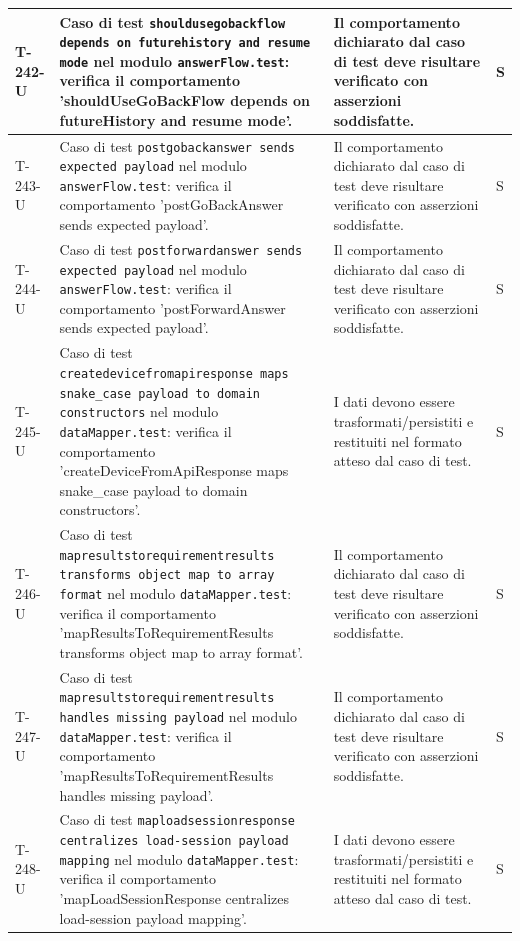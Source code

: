 \documentclass[a4paper,12pt]{article}
\begin{document}
{{\begin{longtable}{|>{\RaggedRight\arraybackslash}p{1.55cm}|>{\RaggedRight\arraybackslash}p{8.0cm}|>{\RaggedRight\arraybackslash}p{4.6cm}|>{\RaggedRight\arraybackslash}p{1.2cm}|}
        \hline
        T-242-U & Caso di test \texttt{shouldusegobackflow depends on futurehistory and resume mode} nel modulo \texttt{answerFlow.test}: verifica il comportamento 'shouldUseGoBackFlow depends on futureHistory and resume mode'. & Il comportamento dichiarato dal caso di test deve risultare verificato con asserzioni soddisfatte. & S \\
        \hline
        T-243-U & Caso di test \texttt{postgobackanswer sends expected payload} nel modulo \texttt{answerFlow.test}: verifica il comportamento 'postGoBackAnswer sends expected payload'. & Il comportamento dichiarato dal caso di test deve risultare verificato con asserzioni soddisfatte. & S \\
        \hline
        T-244-U & Caso di test \texttt{postforwardanswer sends expected payload} nel modulo \texttt{answerFlow.test}: verifica il comportamento 'postForwardAnswer sends expected payload'. & Il comportamento dichiarato dal caso di test deve risultare verificato con asserzioni soddisfatte. & S \\
        \hline
        T-245-U & Caso di test \texttt{createdevicefromapiresponse maps snake\_case payload to domain constructors} nel modulo \texttt{dataMapper.test}: verifica il comportamento 'createDeviceFromApiResponse maps snake\_case payload to domain constructors'. & I dati devono essere trasformati/persistiti e restituiti nel formato atteso dal caso di test. & S \\
        \hline
        T-246-U & Caso di test \texttt{mapresultstorequirementresults transforms object map to array format} nel modulo \texttt{dataMapper.test}: verifica il comportamento 'mapResultsToRequirementResults transforms object map to array format'. & Il comportamento dichiarato dal caso di test deve risultare verificato con asserzioni soddisfatte. & S \\
        \hline
        T-247-U & Caso di test \texttt{mapresultstorequirementresults handles missing payload} nel modulo \texttt{dataMapper.test}: verifica il comportamento 'mapResultsToRequirementResults handles missing payload'. & Il comportamento dichiarato dal caso di test deve risultare verificato con asserzioni soddisfatte. & S \\
        \hline
        T-248-U & Caso di test \texttt{maploadsessionresponse centralizes load-session payload mapping} nel modulo \texttt{dataMapper.test}: verifica il comportamento 'mapLoadSessionResponse centralizes load-session payload mapping'. & I dati devono essere trasformati/persistiti e restituiti nel formato atteso dal caso di test. & S \\

\end{longtable}}}
\end{document}
